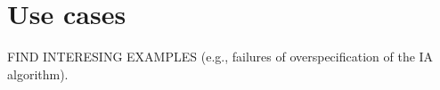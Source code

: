 \section{Use cases}\label{sec:usecases}


FIND INTERESING EXAMPLES (e.g., failures of overspecification of the IA algorithm). 

